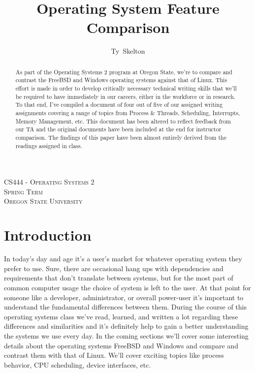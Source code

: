 \documentclass[10pt,draftclsnofoot,onecolumn]{IEEEtran}
\begin{document}
\singlespacing %
\title{Operating System Feature Comparison}

\author{Ty~Skelton}

\maketitle

\begin{abstract}
As part of the Operating Systems 2 program at Oregon State, we're to compare and contrast the FreeBSD and Windows operating systems against that of Linux.
This effort is made in order to develop critically necessary technical writing skills that we'll be required to have immediately in our careers, either in the workforce or in research.
To that end, I've compiled a document of four out of five of our assigned writing assignments covering a range of topics from Process \& Threads, Scheduling, Interrupts, Memory Management, etc.
This document has been altered to reflect feedback from our TA and the original documents have been included at the end for instructor comparison.
The findings of this paper have been almost entirely derived from the readings assigned in class.
\end{abstract}

\begin{center}
\scshape %
CS444 - Operating Systems 2 \\  %
Spring Term\\[\baselineskip]    %
Oregon State University\par     %
\end{center}

\IEEEpeerreviewmaketitle

\newpage
{}
\tableofcontents
\newpage

\section{Introduction}
\label{sec:Introduction}
\par In today's day and age it's a user's market for whatever operating system they prefer to use.
Sure, there are occasional hang ups with dependencies and requirements that don't translate between systems, but for the most part of common computer usage the choice of system is left to the user.
At that point for someone like a developer, administrator, or overall power-user it's important to understand the fundamental differences between them.
During the course of this operating systems class we've read, learned, and written a lot regarding these differences and similarities and it's definitely help to gain a better understanding the systems we use every day.
In the coming sections we'll cover some interesting details about the operating systems FreeBSD and Windows and compare and contrast them with that of Linux.
We'll cover exciting topics like process behavior, CPU scheduling, device interfaces, etc.
\end{document}
